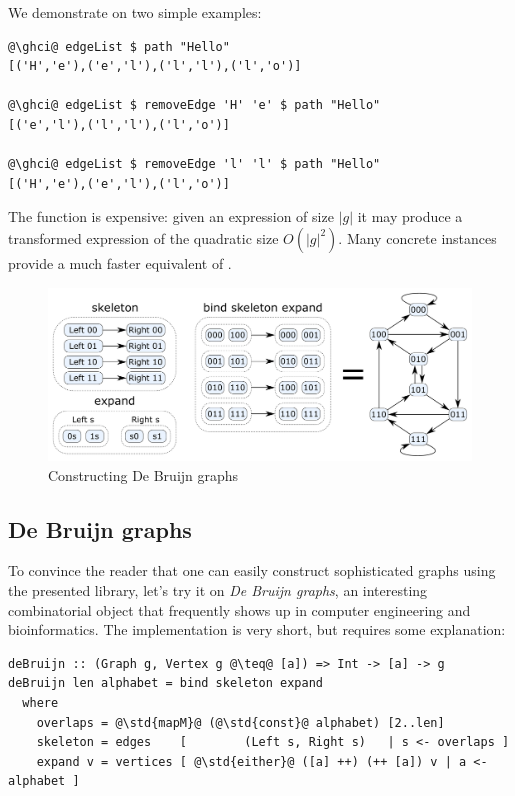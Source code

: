 We demonstrate  on two simple examples:
\begin{verbatim}
@\ghci@ edgeList $ path "Hello"
[('H','e'),('e','l'),('l','l'),('l','o')]

@\ghci@ edgeList $ removeEdge 'H' 'e' $ path "Hello"
[('e','l'),('l','l'),('l','o')]

@\ghci@ edgeList $ removeEdge 'l' 'l' $ path "Hello"
[('H','e'),('e','l'),('l','o')]
\end{verbatim}

\noindent
The  function is expensive: given an expression of size $|g|$
it may produce a transformed expression of the quadratic size $O(|g|^2)$. Many
concrete  instances provide a much faster equivalent of .

\begin{figure}
\centerline{\includegraphics[scale=0.3]{fig/De-Bruijn-construction.pdf}}
\vspace{-4mm}
\caption{Constructing De Bruijn graphs\label{fig-de-bruijn}}
\vspace{-4mm}
\end{figure}


\subsection{De Bruijn graphs}

To convince the reader that one can easily construct sophisticated graphs using
the presented library, let's try it on \emph{De Bruijn graphs}, an interesting
combinatorial object that frequently shows up in computer engineering and
bioinformatics. The implementation is very short, but requires some explanation:

\begin{verbatim}
deBruijn :: (Graph g, Vertex g @\teq@ [a]) => Int -> [a] -> g
deBruijn len alphabet = bind skeleton expand
  where
    overlaps = @\std{mapM}@ (@\std{const}@ alphabet) [2..len]
    skeleton = edges    [        (Left s, Right s)   | s <- overlaps ]
    expand v = vertices [ @\std{either}@ ([a] ++) (++ [a]) v | a <- alphabet ]
\end{verbatim}

